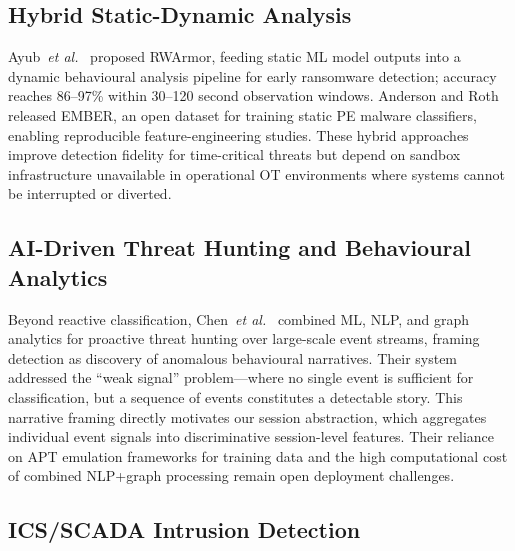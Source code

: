 \subsection{Hybrid Static-Dynamic Analysis}

Ayub~\textit{et al.}\ \cite{ayub2023} proposed RWArmor, feeding static ML model outputs
into a dynamic behavioural analysis pipeline for early ransomware detection; accuracy
reaches 86--97\% within 30--120 second observation windows. Anderson and Roth
\cite{anderson2018} released EMBER, an open dataset for training static PE malware
classifiers, enabling reproducible feature-engineering studies. These hybrid approaches
improve detection fidelity for time-critical threats but depend on sandbox infrastructure
unavailable in operational OT environments where systems cannot be interrupted or diverted.

\subsection{AI-Driven Threat Hunting and Behavioural Analytics}

Beyond reactive classification, Chen~\textit{et al.}\ \cite{chen2022} combined ML, NLP,
and graph analytics for proactive threat hunting over large-scale event streams, framing
detection as discovery of anomalous behavioural narratives. Their system addressed the
``weak signal'' problem—where no single event is sufficient for classification, but a
sequence of events constitutes a detectable story. This narrative framing directly motivates
our session abstraction, which aggregates individual event signals into discriminative
session-level features. Their reliance on APT emulation frameworks for training data and the
high computational cost of combined NLP+graph processing remain open deployment challenges.

\subsection{ICS/SCADA Intrusion Detection}


